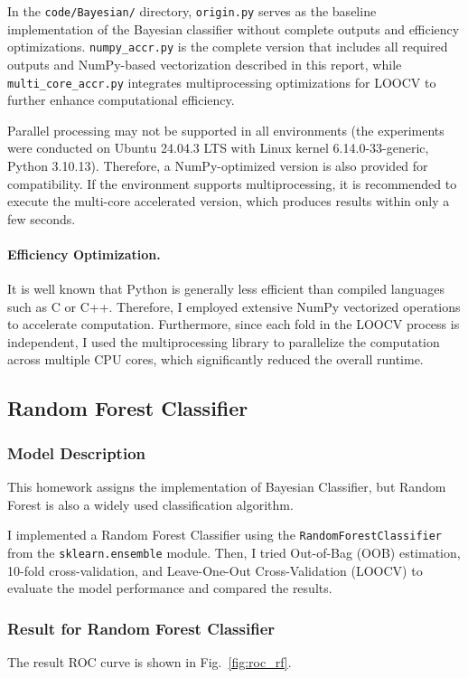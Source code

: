 \documentclass[12pt,a4paper]{article}
\begin{document}
In the \texttt{code/Bayesian/} directory, \texttt{origin.py} serves as the baseline implementation of the Bayesian classifier without complete outputs and efficiency optimizations. \texttt{numpy\_accr.py} is the complete version that includes all required outputs and NumPy-based vectorization described in this report, while \texttt{multi\_core\_accr.py} integrates multiprocessing optimizations for LOOCV to further enhance computational efficiency.

Parallel processing may not be supported in all environments (the experiments were conducted on Ubuntu 24.04.3 LTS with Linux kernel 6.14.0-33-generic, Python 3.10.13). Therefore, a NumPy-optimized version is also provided for compatibility. If the environment supports multiprocessing, it is recommended to execute the multi-core accelerated version, which produces results within only a few seconds.



\paragraph{Efficiency Optimization.}
It is well known that Python is generally less efficient than compiled languages such as C or C++. Therefore, I employed extensive NumPy vectorized operations to accelerate computation. Furthermore, since each fold in the LOOCV process is independent, I used the multiprocessing library to parallelize the computation across multiple CPU cores, which significantly reduced the overall runtime.


\subsection{Random Forest Classifier}
\subsubsection{Model Description}
This homework assigns the implementation of Bayesian Classifier, but Random Forest is also a widely used classification algorithm.

I implemented a Random Forest Classifier using the \texttt{RandomForestClassifier} from the \texttt{sklearn.ensemble} module. Then, I tried Out-of-Bag (OOB) estimation, 10-fold cross-validation, and Leave-One-Out Cross-Validation (LOOCV) to evaluate the model performance and compared the results. 


\subsubsection{Result for Random Forest Classifier}
The result ROC curve is shown in Fig.~\ref{fig:roc_rf}.
\end{document}
